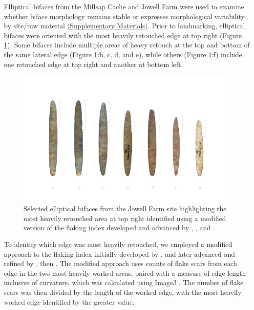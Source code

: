 \documentclass[]{interact}
\theoremstyle{plain}%
\theoremstyle{definition}
\theoremstyle{remark}
\begin{document}
Elliptical bifaces from the Millsap Cache and Jowell Farm were used to
examine whether biface morphology remains stable or expresses
morphological variability by site/raw material
(\href{https://seldenlab.github.io/elliptical.bifaces/gm---siteraw-material.html}{Supplementary
Materials}). Prior to landmarking, elliptical bifaces were oriented with
the most heavily retouched edge at top right (Figure
\ref{fig:elliptical}). Some bifaces include multiple areas of heavy
retouch at the top and bottom of the same lateral edge (Figure
\ref{fig:elliptical}:b, c, d, and e), while others (Figure
\ref{fig:elliptical}:f) include one retouched edge at top right and
another at bottom left.

\begin{figure}\centering
\includegraphics[width=\linewidth]{figs/ellipticalbifaces.png}
\caption{Selected elliptical bifaces from the Jowell Farm site highlighting the most heavily retouched area at top right identified using a modified version of the flaking index developed and advanced by \citet{RN11099}, \citet{RN9242}, and \citet{RN11098}.}
\label{fig:elliptical}
\end{figure}

To identify which edge was most heavily retouched, we employed a
modified approach to the flaking index initially developed by
\citet{RN11099}, and later advanced and refined by \citet{RN9242}, then
\citet{RN11098}. The modified approach uses counts of flake scars from
each edge in the two most heavily worked areas, paired with a measure of
edge length inclusive of curvature, which was calculated using ImageJ
\citep{RN11146,RN11147,RN11148}. The number of flake scars was then
divided by the length of the worked edge, with the most heavily worked
edge identified by the greater value.
\end{document}
